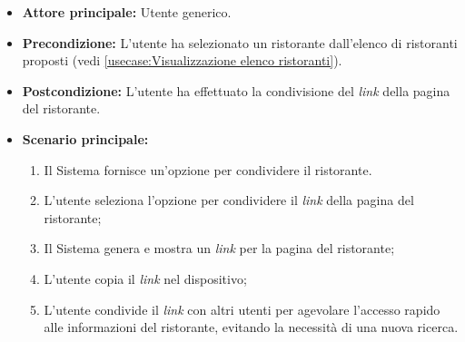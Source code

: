 \label{usecase:Condivisione link del ristorante}
\begin{itemize}
    \item \textbf{Attore principale:} Utente generico.


	\item \textbf{Precondizione:} 
		  L'utente ha selezionato un ristorante dall'elenco di ristoranti proposti (vedi \autoref{usecase:Visualizzazione elenco ristoranti}).

	\item \textbf{Postcondizione:}
	      L'utente ha effettuato la condivisione del \textit{link} della pagina del ristorante.

	\item \textbf{Scenario principale:}
	      \begin{enumerate}
			  \item Il Sistema fornisce un'opzione per condividere il ristorante.
			  \item L'utente seleziona l'opzione per condividere il \textit{link} della pagina del ristorante;
		      \item Il Sistema genera e mostra un \textit{link} per la pagina del ristorante;
		      \item L'utente copia il \textit{link} nel dispositivo;
			  \item L'utente condivide il \textit{link} con altri utenti per agevolare l'accesso rapido alle 
			  		informazioni del ristorante, evitando la necessità di una nuova ricerca.
	      \end{enumerate}
\end{itemize}
